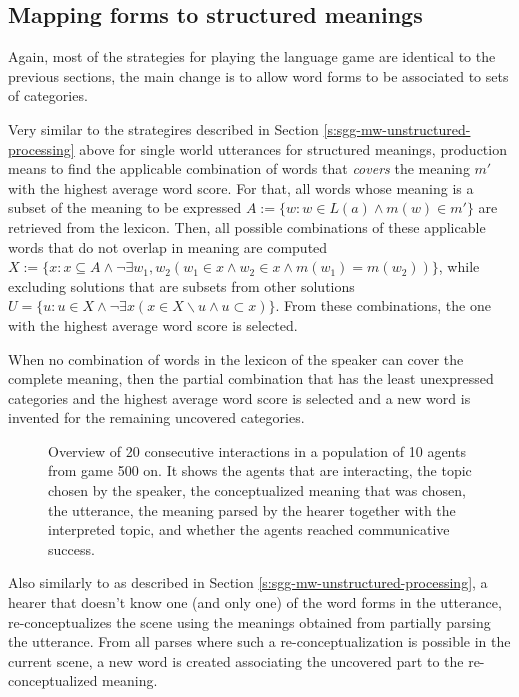 \subsection{Mapping forms to structured meanings}

Again, most of the strategies for playing the language game are
identical to the previous sections, the main change is to allow word
forms to be associated to sets of categories. 

 Very similar to the strategires described in
Section \ref{s:sgg-mw-unstructured-processing} above for single world
utterances for structured meanings, production means to find the
applicable combination of words that \emph{covers} the meaning $m'$
with the highest average word score. For that, all words whose meaning
is a subset of the meaning to be expressed $A:=\{w: w \in L(a) \wedge
m(w) \in m'\}$ are retrieved from the lexicon. Then, all possible
combinations of these applicable words that do not overlap in meaning
are computed $X := \{x: x \subseteq A \wedge \neg\exists w_1,w_2 (w_1
\in x \wedge w_2 \in x \wedge m(w_1) = m(w_2))\}$, while excluding
solutions that are subsets from other solutions $U = \{u : u \in X
\wedge \neg \exists x (x \in X \backslash u \wedge u \subset
x)\}$. From these combinations, the one with the highest average word
score is selected.


 When no combination of words in the lexicon of
the speaker can cover the complete meaning, then the partial
combination that has the least unexpressed categories and the highest
average word score is selected and a new word is invented for the
remaining uncovered categories.

\begin{figure}[p]
  \caption{Overview of 20 consecutive interactions in a population of
    10 agents from game 500 on. It shows the agents that are
    interacting, the topic chosen by the speaker, the conceptualized
    meaning that was chosen, the utterance, the meaning parsed by the
    hearer together with the interpreted topic, and whether the agents
    reached communicative success.}
  \label{f:sgg-mw-structured-trace}
\end{figure}


 Also similarly to as described in Section
\ref{s:sgg-mw-unstructured-processing}, a hearer that doesn't know one
(and only one) of the word forms in the utterance, re-conceptualizes
the scene using the meanings obtained from partially parsing the
utterance. From all parses where such a re-conceptualization is
possible in the current scene, a new word is created associating the
uncovered part to the re-conceptualized meaning.


